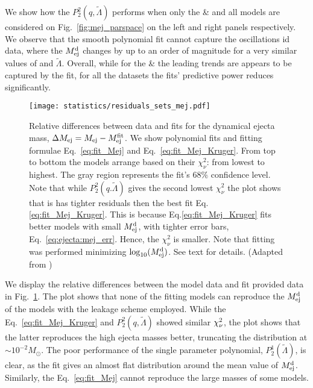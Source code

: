 We show how the $P_2^2(q,\tilde{\Lambda})$ performs when only the 
 \DSrefset{} \& \DSheatcool{} and all models 
are considered on Fig.~\ref{fig:mej_parspace} on the left and right panels respectively. 
We observe that the smooth polynomial fit cannot capture the oscillations id data, where 
the $M^{\text{d}}_{\text{ej}}$ changes by up to an order of magnitude for a very similar values of \mr{} and 
$\tilde{\Lambda}$. Overall, while for the  \DSrefset{} \& \DSheatcool{}
 the leading trends are appears to be 
captured by the fit, for all the datasets the fits' predictive power reduces significantly.
\begin{figure}[t]
    \centering 
    \texttt{[image: statistics/residuals\_sets\_mej.pdf]}
    \caption{
        Relative differences between data and fits for the dynamical ejecta
        mass, $\Delta M_{\rm ej} = M_{\rm ej} - M^{\rm fit}_{\rm ej}$.
        We show polynomial fits and fitting formulae
        Eq.~\eqref{eq:fit_Mej} and Eq.~\eqref{eq:fit_Mej_Kruger}.
        From top to bottom the models arrange based on their $\chi_{\nu}^2$: from lowest to highest.
        The gray region represents the fit's $68\%$ confidence level.
        Note that while $P_2^2(q.\tilde{\Lambda})$ gives the second lowest $\chi_{\nu}^2$
        the plot shows that is has tighter residuals then the best fit Eq.\eqref{eq:fit_Mej_Kruger}.
        This is because Eq.\eqref{eq:fit_Mej_Kruger} fits better models with small $M^{\text{d}}_{\text{ej}}$,
        with tighter error bars, Eq.~\eqref{eq:ejecta:mej_err}. Hence,
        the $\chi_{\nu}^2$ is smaller.
        Note that fitting was performed minimizing $\log_{10}(M^{\text{d}}_{\text{ej}})$. See text for details.
        (Adapted from \citet{Nedora:2020qtd})
    }
    \label{fig:ejecta:dyn:m}
\end{figure}

We display the relative differences between the model data and fit provided data in 
Fig.~\ref{fig:ejecta:dyn:m}. The plot shows that none of the fitting models can 
reproduce the $M^{\text{d}}_{\text{ej}}$ of the \DScool{} models with the leakage scheme employed.
While the Eq.~\eqref{eq:fit_Mej_Kruger} and $P_2^2(q,\tilde{\Lambda})$ showed similar 
$\chi_{\nu}^2$, the plot shows that the latter reproduces the high ejecta masses better, 
truncating the distribution at $\sim10^{-2}M_{\odot}$. 
The poor performance of the single parameter polynomial, $P_2^1(\tilde{\Lambda})$,
is clear, as the fit gives an almost flat distribution around the mean value of $M^{\text{d}}_{\text{ej}}$.
Similarly, the Eq.~\eqref{eq:fit_Mej} cannot reproduce the large masses of some 
models.

